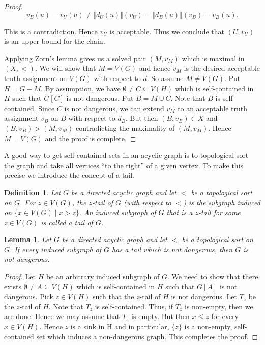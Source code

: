 \documentclass[12pt]{kluwer}
\newtheorem{lem}[thm]{Lemma}
\newtheorem{defn}{Definition}
\theoremstyle{remark}
\begin{document}
\begin{proof}
\[v_B(u) = v_U(u) \neq \llbracket d_U(u)\rrbracket(v_U) = \llbracket d_B(u)\rrbracket(v_B) = v_B(u).\]

This is a contradiction.  Hence $v_U$ is acceptable.  Thus we conclude that $(U, v_U)$ is an upper bound for the chain.\newline

Applying Zorn's lemma gives us a solved pair $(M, v_M)$ which is maximal in $(X, <)$.  We will show that $M = V(G)$ and hence $v_M$ is the desired acceptable truth assignment on $V(G)$ with respect to $d$.  So assume $M \neq V(G)$.  Put $H = G - M$.  By assumption, we have $\emptyset \neq C \subseteq V(H)$ which is self-contained in $H$ such that $G[C]$ is not dangerous.  Put $B = M \cup C$.  Note that $B$ is self-contained.  Since $C$ is not dangerous, we can extend $v_M$ to an acceptable truth assignment $v_B$ on $B$ with respect to $d_B$.  But then $(B, v_B) \in X$ and $(B, v_B) > (M, v_M)$ contradicting the maximality of $(M, v_M)$. Hence $M = V(G)$ and the proof is complete.
\end{proof}


A good way to get self-contained sets in an acyclic graph is to topological sort the graph and take all vertices ``to the right'' of a given vertex.  To make this precise we introduce the concept of a tail.

\begin{defn}
Let $G$ be a directed acyclic graph and let $<$ be a topological sort on $G$.  For $z \in V(G)$, the $z$-tail of $G$ (with respect to $<$) is the subgraph induced on $\{x \in V(G) \mid x > z\}$.  An induced subgraph of $G$ that is a $z$-tail for some $z \in V(G)$ is called a \emph{tail} of $G$.
\end{defn}

\begin{lem}\label{TailLemma}
Let $G$ be a directed acyclic graph and let $<$ be a topological sort on $G$.  If every induced subgraph of $G$ has a tail which is not dangerous, then $G$ is not dangerous.
\end{lem}
\begin{proof}
Let $H$ be an arbitrary induced subgraph of $G$.  We need to show that there exists $\emptyset \neq A \subseteq V(H)$ which is self-contained in $H$ such that $G[A]$ is not dangerous.  Pick $z \in V(H)$ such that the $z$-tail of $H$ is not dangerous.  Let $T_z$ be the $z$-tail of $H$.  Note that $T_z$ is self-contained.  Thus, if $T_z$ is non-empty, then we are done.  Hence we may assume that $T_z$ is empty.  But then $x \leq z$ for every $x \in V(H)$.  Hence $z$ is a sink in H and in particular, $\{z\}$ is a non-empty, self-contained set which induces a non-dangerous graph.  This completes the proof.
\end{proof}
\end{document}
